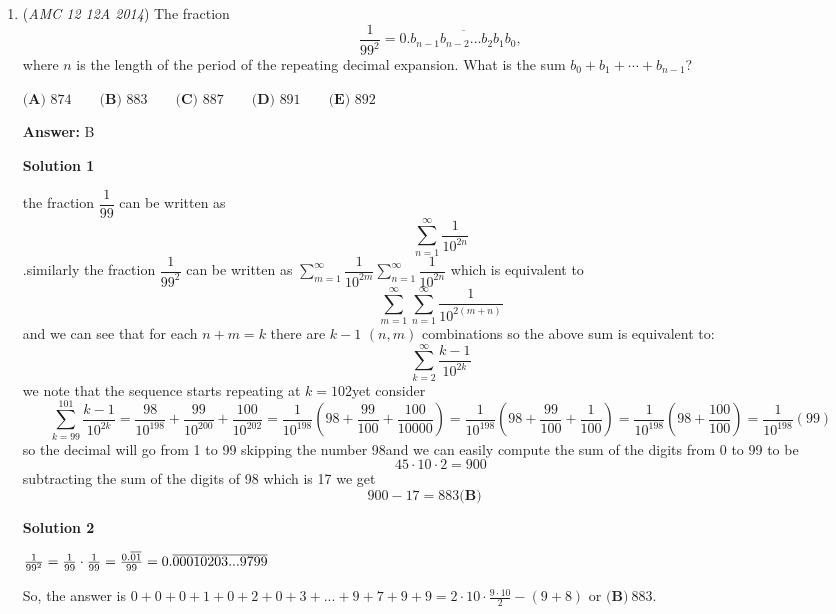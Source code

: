 \begin{enumerate}
 


	\item (\textit{AMC 12 12A 2014}) The fraction 
 \[\dfrac1{99^2}=0.\overline{b_{n-1}b_{n-2}\ldots b_2b_1b_0},\] where $n$ is the length of the period of the repeating decimal expansion.  What is the sum $b_0+b_1+\cdots+b_{n-1}$?


 $\textbf{(A) }874\qquad \textbf{(B) }883\qquad \textbf{(C) }887\qquad \textbf{(D) }891\qquad \textbf{(E) }892\qquad$

 \textbf{Answer: }B



\textbf{Solution 1}

the fraction $\dfrac{1}{99}$ can be written as 
 \[\sum^{\infty}_{n=1}\dfrac{1}{10^{2n}}\].similarly the fraction $\dfrac{1}{99^2}$ can be written as $\sum^{\infty}_{m=1}\dfrac{1}{10^{2m}}\sum^{\infty}_{n=1}\dfrac{1}{10^{2n}}$ which is equivalent to 
 \[\sum^{\infty}_{m=1}\sum^{\infty}_{n=1} \dfrac{1}{10^{2(m+n)}}\]and we can see that for each $n+m=k$ there are $k-1$ $(n,m)$ combinations so the above sum is equivalent to:
 \[\sum^{\infty}_{k=2}\dfrac{k-1}{10^{2k}}\]we note that the sequence starts repeating at $k = 102$yet consider 
 \[\sum^{101}_{k=99}\dfrac{k-1}{10^{2k}}=\dfrac{98}{{10^{198}}}+\dfrac{99}{{10^{200}}}+\dfrac{100}{10^{{202}}}=\dfrac{1}{10^{198}}(98+\dfrac{99}{100}+\dfrac{100}{10000})=\dfrac{1}{10^{198}}(98+\dfrac{99}{100}+\dfrac{1}{100})=\dfrac{1}{10^{198}}(98+\dfrac{100}{100})=\dfrac{1}{10^{198}}(99)\]so the decimal will go from 1 to 99 skipping the number 98and we can easily compute the sum of the digits from 0 to 99 to be 
 \[45\cdot10\cdot2=900\] subtracting the sum of the digits of 98 which is 17 we get
 \[900-17=883\textbf{(B) }\qquad\]




\textbf{Solution 2}

$\frac{1}{99^2}\\\\ =\frac{1}{99} \cdot \frac{1}{99}\\\\ =\frac{0.\overline{01}}{99}\\\\ =0.\overline{00010203...9799}$

 So, the answer is $0+0+0+1+0+2+0+3+...+9+7+9+9=2\cdot10\cdot\frac{9\cdot10}{2}-(9+8)$ or $\boxed{\textbf{(B)}\ 883}$.


\end{enumerate}
